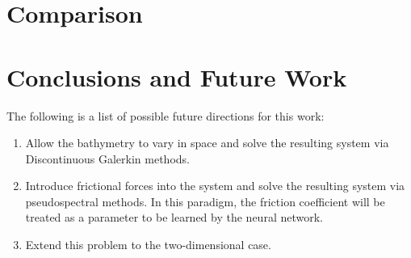 \documentclass[letterpaper,11pt]{article}
\begin{document}
    

    \section{Comparison}\label{sec:comparison}
    
    \section{Conclusions and Future Work}\label{sec:conclusion}

    The following is a list of possible future directions for this work:

    \begin{enumerate}
        \item Allow the bathymetry to vary in space and solve the resulting system via Discontinuous Galerkin methods.
        \item Introduce frictional forces into the system and solve the resulting system via pseudospectral methods. In
              this paradigm, the friction coefficient will be treated as a parameter to be learned by the neural 
              network.
        \item Extend this problem to the two-dimensional case.
    \end{enumerate}

    \pagebreak

    
    

    \pagebreak
    \appendix
    
\end{document}
